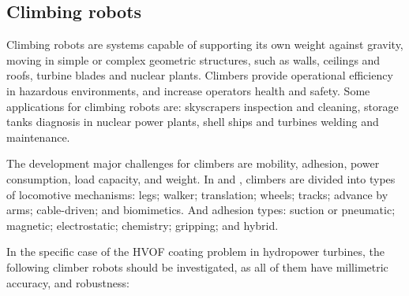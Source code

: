\subsection{Climbing robots}\label{sota_climbers}
Climbing robots are systems capable of supporting its own weight against
gravity, moving in simple or complex geometric structures, such as
walls, ceilings and roofs, turbine blades and nuclear plants.
Climbers provide operational efficiency in hazardous environments, and increase
operators health and safety. Some applications for climbing robots are:
skyscrapers inspection and cleaning, storage tanks diagnosis in nuclear
power plants, shell ships and turbines welding and
maintenance\citep{armada2003application}.

The development major challenges for climbers are mobility, adhesion, power
consumption, load capacity, and weight. In \cite{modular} and \cite{climbsurv},
climbers are divided into types of locomotive mechanisms: legs; walker; translation; wheels; tracks;
advance by arms; cable-driven; and biomimetics. And adhesion types:
suction or pneumatic; magnetic; electrostatic; chemistry; gripping; and hybrid.

In the specific case of the HVOF coating problem in hydropower turbines, the
following climber robots should be investigated, as all of them have millimetric
accuracy, and robustness:

